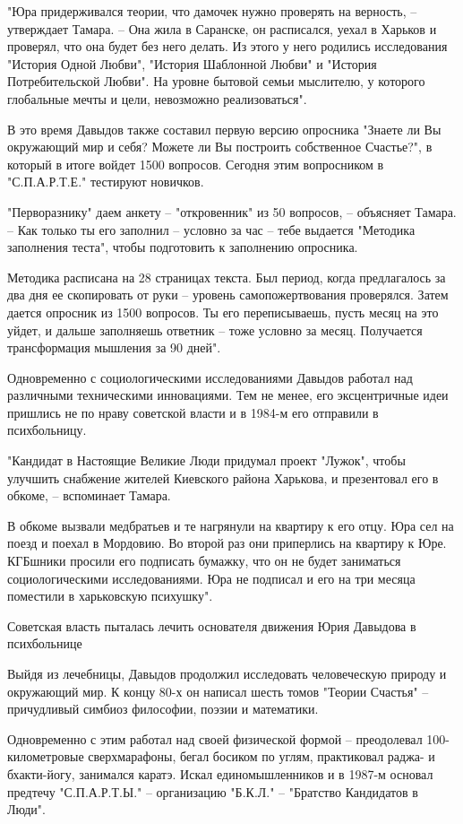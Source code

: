 "Юра придерживался теории, что дамочек нужно проверять на верность, –
утверждает Тамара. – Она жила в Саранске, он расписался, уехал в Харьков и
проверял, что она будет без него делать. Из этого у него родились исследования
"История Одной Любви", "История Шаблонной Любви" и "История Потребительской
Любви". На уровне бытовой семьи мыслителю, у которого глобальные мечты и цели,
невозможно реализоваться".

В это время Давыдов также составил первую версию опросника "Знаете ли Вы
окружающий мир и себя? Можете ли Вы построить собственное Счастье?", в который
в итоге войдет 1500 вопросов. Сегодня этим вопросником в "С.П.А.Р.Т.Е."
тестируют новичков.

"Перворазнику" даем анкету – "откровенник" из 50 вопросов, – объясняет Тамара.
– Как только ты его заполнил – условно за час – тебе выдается "Методика
заполнения теста", чтобы подготовить к заполнению опросника.

Методика расписана на 28 страницах текста. Был период, когда предлагалось за
два дня ее скопировать от руки – уровень самопожертвования проверялся. Затем
дается опросник из 1500 вопросов. Ты его переписываешь, пусть месяц на это
уйдет, и дальше заполняешь ответник – тоже условно за месяц. Получается
трансформация мышления за 90 дней".

Одновременно с социологическими исследованиями Давыдов работал над различными
техническими инновациями. Тем не менее, его эксцентричные идеи пришлись не по
нраву советской власти и в 1984-м его отправили в психбольницу.

"Кандидат в Настоящие Великие Люди придумал проект "Лужок", чтобы улучшить
снабжение жителей Киевского района Харькова, и презентовал его в обкоме, –
вспоминает Тамара. 

В обкоме вызвали медбратьев и те нагрянули на квартиру к его отцу. Юра сел на
поезд и поехал в Мордовию. Во второй раз они приперлись на квартиру к Юре.
КГБшники просили его подписать бумажку, что он не будет заниматься
социологическими исследованиями. Юра не подписал и его на три месяца поместили
в харьковскую психушку".

Советская власть пыталась лечить основателя движения Юрия Давыдова в психбольнице

Выйдя из лечебницы, Давыдов продолжил исследовать человеческую природу и
окружающий мир. К концу 80-х он написал шесть томов "Теории Счастья" –
причудливый симбиоз философии, поэзии и математики. 

Одновременно с этим работал над своей физической формой – преодолевал
100-километровые сверхмарафоны, бегал босиком по углям, практиковал раджа- и
бхакти-йогу, занимался каратэ. Искал единомышленников и в 1987-м основал
предтечу "С.П.А.Р.Т.Ы." – организацию "Б.К.Л." – "Братство Кандидатов в Люди".

